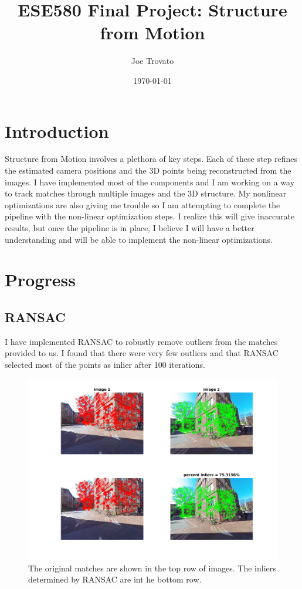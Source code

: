 \documentclass{article}
\begin{document}
\title{ESE580 Final Project: Structure from Motion}
\author{Joe Trovato}
\date{\today}
\maketitle
\setlength{\parindent}{10ex}

\section{Introduction}
\par
Structure from Motion involves a plethora of key steps. Each of these step refines the estimated camera positions and the 3D points being reconstructed from the images. I have implemented most of the components and I am working on a way to track matches through multiple images and the 3D structure. My nonlinear optimizations are also giving me trouble so I am attempting to complete the pipeline with the non-linear optimization steps. I realize this will give inaccurate results, but once the pipeline is in place, I believe I will have a better understanding and will be able to implement the non-linear optimizations. 

\section{Progress}

\subsection{RANSAC}
I have implemented RANSAC to robustly remove outliers from the matches provided to us. I found that there were very few outliers and that RANSAC selected most of the points as inlier after 100 iterations. 
\FloatBarrier

\begin{figure}[!h]
\includegraphics[width = \textwidth]{orig_and_ransac.png}
\centering
\caption{The original matches are shown in the top row of images. The inliers determined by RANSAC are int he bottom row.}
\end{figure}
\end{document}
